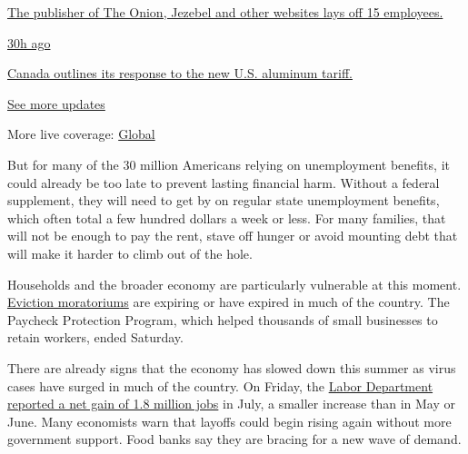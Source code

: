 \href{https://www.nytimes.com/live/2020/08/07/business/stock-market-today-coronavirus?action=click\&pgtype=Article\&state=default\&region=MAIN_CONTENT_1\&context=storylines_live_updates\#the-publisher-of-the-onion-jezebel-and-other-websites-lays-off-15-employees}{The
publisher of The Onion, Jezebel and other websites lays off 15
employees.}

\href{https://www.nytimes.com/live/2020/08/07/business/stock-market-today-coronavirus?action=click\&pgtype=Article\&state=default\&region=MAIN_CONTENT_1\&context=storylines_live_updates\#canada-outlines-its-response-to-the-new-us-aluminum-tariff}{30h
ago}

\href{https://www.nytimes.com/live/2020/08/07/business/stock-market-today-coronavirus?action=click\&pgtype=Article\&state=default\&region=MAIN_CONTENT_1\&context=storylines_live_updates\#canada-outlines-its-response-to-the-new-us-aluminum-tariff}{Canada
outlines its response to the new U.S. aluminum tariff.}

\href{https://www.nytimes.com/live/2020/08/07/business/stock-market-today-coronavirus?action=click\&pgtype=Article\&state=default\&region=MAIN_CONTENT_1\&context=storylines_live_updates}{See
more updates}

More live coverage:
\href{https://www.nytimes.com/2020/08/07/world/covid-19-news.html?action=click\&pgtype=Article\&state=default\&region=MAIN_CONTENT_1\&context=storylines_live_updates}{Global}

But for many of the 30 million Americans relying on unemployment
benefits, it could already be too late to prevent lasting financial
harm. Without a federal supplement, they will need to get by on regular
state unemployment benefits, which often total a few hundred dollars a
week or less. For many families, that will not be enough to pay the
rent, stave off hunger or avoid mounting debt that will make it harder
to climb out of the hole.

Households and the broader economy are particularly vulnerable at this
moment.
\href{https://www.nytimes.com/2020/08/07/business/economy/housing-economy-eviction-renters.html}{Eviction
moratoriums} are expiring or have expired in much of the country. The
Paycheck Protection Program, which helped thousands of small businesses
to retain workers, ended Saturday.

There are already signs that the economy has slowed down this summer as
virus cases have surged in much of the country. On Friday, the
\href{https://www.nytimes.com/2020/08/07/business/economy/july-jobs-report.html}{Labor
Department reported a net gain of 1.8 million jobs} in July, a smaller
increase than in May or June. Many economists warn that layoffs could
begin rising again without more government support. Food banks say they
are bracing for a new wave of demand.

